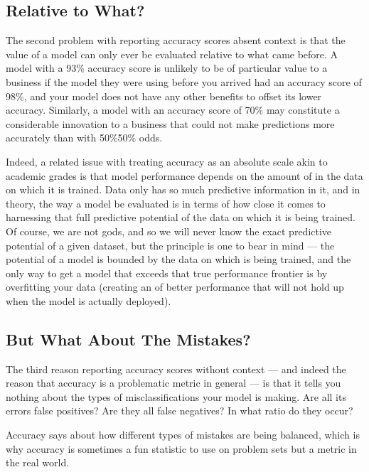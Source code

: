 \documentclass[letterpaper,10pt,english]{jupyterBook}
\begin{document}
\subsection{Relative to What?}
\label{\detokenize{30_questions/26_passive_prediction_errors:relative-to-what}}
\sphinxAtStartPar
The second problem with reporting accuracy scores absent context is that the value of a model can only ever be evaluated relative to what came before. A model with a 93\% accuracy score is unlikely to be of particular value to a business if the model they were using before you arrived had an accuracy score of 98\%, and your model does not have any other benefits to offset its lower accuracy. Similarly, a model with an accuracy score of 70\% may constitute a considerable innovation to a business that could not make predictions more accurately than with 50\%\sphinxhyphen{}50\% odds.

\sphinxAtStartPar
Indeed, a related issue with treating accuracy as an absolute scale akin to academic grades is that model performance depends on the amount of  in the data on which it is trained. Data only has so much predictive information in it, and in theory, the way a model  be evaluated is in terms of how close it comes to harnessing that full predictive potential of the data on which it is being trained. Of course, we are not gods, and so we will never know the exact predictive potential of a given dataset, but the principle is one to bear in mind — the potential of a model is bounded by the data on which is being trained, and the only way to get a model that exceeds that true performance frontier is by overfitting your data (creating an  of better performance that will not hold up when the model is actually deployed).


\subsection{But What About The Mistakes?}
\label{\detokenize{30_questions/26_passive_prediction_errors:but-what-about-the-mistakes}}
\sphinxAtStartPar
The third reason reporting accuracy scores without context — and indeed the reason that accuracy is a problematic metric in general — is that it tells you nothing about the types of misclassifications your model is making. Are all its errors false positives? Are they all false negatives? In what ratio do they occur?

\sphinxAtStartPar
Accuracy says  about how different types of mistakes are being balanced, which is why accuracy is sometimes a fun statistic to use on problem sets but a  metric in the real world.
\end{document}
